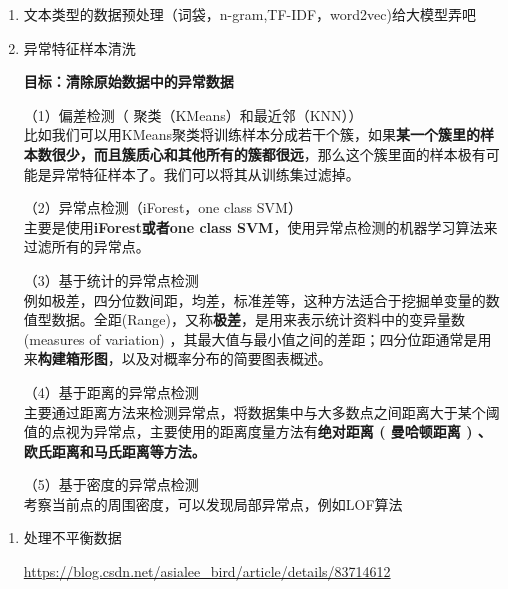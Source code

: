 \documentclass[
]{article}
\begin{document}
\begin{enumerate}
\def\labelenumi{\arabic{enumi}.}
\item
  文本类型的数据预处理（词袋，n-gram,TF-IDF，word2vec)给大模型弄吧
\item
  异常特征样本清洗

  \textbf{目标：清除原始数据中的异常数据}

  （1）偏差检测（ 聚类（KMeans）和最近邻（KNN））\\
  比如我们可以用KMeans聚类将训练样本分成若干个簇，如果\textbf{某一个簇里的样本数很少，而且簇质心和其他所有的簇都很远}，那么这个簇里面的样本极有可能是异常特征样本了。我们可以将其从训练集过滤掉。

  （2）异常点检测（iForest，one class SVM）\\
  主要是使用\textbf{iForest或者one class
  SVM}，使用异常点检测的机器学习算法来过滤所有的异常点。

  （3）基于统计的异常点检测\\
  例如极差，四分位数间距，均差，标准差等，这种方法适合于挖掘单变量的数值型数据。全距(Range)，又称\textbf{极差}，是用来表示统计资料中的变异量数(measures
  of variation)
  ，其最大值与最小值之间的差距；四分位距通常是用来\textbf{构建箱形图}，以及对概率分布的简要图表概述。

  （4）基于距离的异常点检测\\
  主要通过距离方法来检测异常点，将数据集中与大多数点之间距离大于某个阈值的点视为异常点，主要使用的距离度量方法有\textbf{绝对距离
  ( 曼哈顿距离 ) 、欧氏距离和马氏距离等方法。}

  （5）基于密度的异常点检测\\
  考察当前点的周围密度，可以发现局部异常点，例如LOF算法
\end{enumerate}

\begin{enumerate}
\def\labelenumi{\arabic{enumi}.}
\item
  处理不平衡数据

  \url{https://blog.csdn.net/asialee_bird/article/details/83714612}
\end{enumerate}
\end{document}
